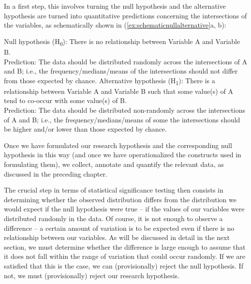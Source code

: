 In a first step, this involves turning the null hypothesis  and the alternative hypothesis are turned into quantitative  predictions concerning the intersections of the variables, as schematically shown in (\ref{ex:schematicnullalternative}a, b):

\begin{exe}
\ex
\begin{xlist}
\label{ex:schematicnullalternative}
\ex Null hypothesis  (H\textsubscript{0}): There is no relationship between Variable A and Variable B. \smallskip\\
Prediction: The data should be distributed  randomly  across the intersections of A and B; i.e., the frequency\slash medians\slash means  of the intersections should not differ from those expected  by  chance.
\ex Alternative hypothesis (H\textsubscript{1}): There is a relationship between Variable A and Variable B such that some value(s) of A tend to co\hyp{}occur with some value(s) of B. \smallskip\\
Prediction: The data should be distributed  non\hyp{}randomly  across the intersections of A and B; i.e., the frequency\slash medians\slash means  of some the intersections should be higher and\slash or lower than those expected  by  chance.
\end{xlist}
\end{exe}

Once we have formulated our research hypothesis and the corresponding null hypothesis  in this way (and once we have operationalized  the constructs used in formulating them), we collect, annotate  and quantify  the relevant data, as discussed in the preceding chapter.

The crucial step in terms of statistical significance  testing then consists in determining whether the observed distribution  differs from the distribution we would expect if the null hypothesis  were true -- if the values of our variables were distributed randomly  in the data. Of course, it is not enough to observe a difference -- a certain amount of variation  is to be expected  even if there is no relationship between our variables. As will be discussed in detail in the next section, we must determine whether the difference is large enough to assume that it does not fall within the range of variation that could occur randomly.  If we are satisfied that this is the case, we can (provisionally) reject the null hypothesis.  If not, we must (provisionally) reject our research hypothesis.

